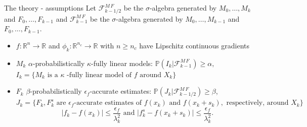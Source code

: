 \documentclass{beamer}
\newcommand{\coarse}{\phi}
\begin{document}
\begin{frame}{The theory - assumptions}
Let $\mathcal{F}^{M\, F}_{k-1/2}$ be
 the $\sigma$-algebra generated by $M_0,\dots,M_{k}$
and $F_0,\dots,F_{k-1}$ and  $\mathcal{F}^{M\, F}_{k-1}$ be
 the $\sigma$-algebra generated by $M_0,\dots,M_{k-1}$
and $F_0,\dots,F_{k-1}$.


\begin{itemize}
\item 
	 $f:\mathbb{R}^n\rightarrow\mathbb{R}$ and $\coarse_k:\mathbb{R}^{n_c}\rightarrow\mathbb{R}$ with $n\geq n_c$ have Lipschitz continuous gradients 

  \item $M_k$ \alert{$\alpha$-probabilistically $\kappa$-fully linear models}: $
\mathbb{P}(I_k|\mathcal{F}^{M\, F}_{k-1}) \geq \alpha,
$ $
I_k = \{M_k \text{ is a } \kappa\text{ -fully linear model of } f \text{ around } X_k\} 
$
\item $F_k$ \alert{$\beta$-probabilistically $\epsilon_f$-accurate estimates}: $\mathbb{P}(J_k|\mathcal{F}^{M\, F}_{k-1/2}) \geq \beta$, 
$
J_k = \{F_k,F_k^s \text{ are } \epsilon_f\text{-accurate estimates of } f(x_k) \text{ and } f(x_k+s_k), \text{ respectively, around } X_k\} 
$ $$
  \lvert f_k-f(x_k)\rvert\leq \frac{\epsilon_f}{\lambda_k^2} \text{ and } \lvert f_k^s-f(x_k+s_k)\rvert\leq \frac{\epsilon_f}{\lambda_k^2}.
  $$
  


\end{itemize}

		\end{frame}
\end{document}
